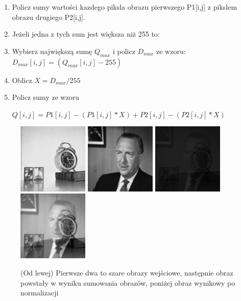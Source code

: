 \documentclass[final,a4paper,openany,12pt]{mwbk}
\begin{document}
	\begin{enumerate}	
		\item Policz sumy wartości kazdego piksla obrazu pierwszego P1[i,j] z pikslem obrazu drugiego P2[i,j].
		\item Jeżeli jedna z tych sum jest większa niż 255 to:
		\item Wybierz największą sumę  $Q_{max}$ i policz $D_{max}$ ze wzoru: $D_{max}[i,j] = (Q_{max}[i,j] - 255)$ 
		\item Oblicz $X = D_{max} / 255$
		\item Policz sumy ze wzoru
		\begin{center}$Q[i,j] = P1[i,j] - (P1[i,j]* X) + P2[i,j] - (P2[i,j] * X) $ \\

		\end{center}
	\end{enumerate}


\begin{figure}[H]
	\begin{center}
		\includegraphics[width=0.3\textwidth]{1/1Gray_Img1_Sum_Original}
		\includegraphics[width=0.3\textwidth]{1/1Gray_Img2_Sum_Original}
		\includegraphics[width=0.3\textwidth]{1/1Gray_Img_Sum_Result}
		\includegraphics[width=0.3\textwidth]{1/1Gray_Img_Sum_Result_Norm}
	\end{center}
	\caption{(Od lewej) Pierwsze dwa to szare obrazy wejściowe, następnie obraz powstały w wyniku sumowania obrazów, poniżej obraz wynikowy po normalizacji }
\end{figure}
\end{document}
